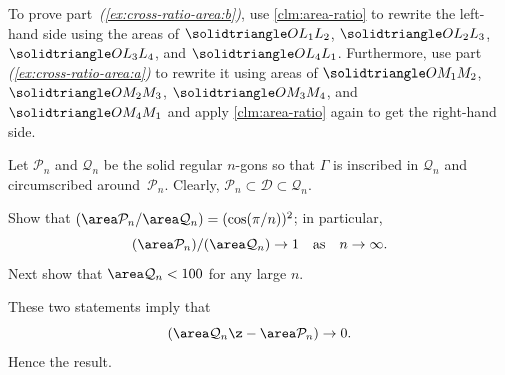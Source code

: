 To prove part~\textit{(\ref{ex:cross-ratio-area:b})}, use \ref{clm:area-ratio} to rewrite the left-hand side using the areas of $\solidtriangle OL_1L_2$, $\solidtriangle OL_2L_3$, $\solidtriangle OL_3L_4$, and $\solidtriangle OL_4L_1$.
Furthermore, use part \textit{(\ref{ex:cross-ratio-area:a})} to rewrite it using areas of $\solidtriangle OM_1M_2$, $\solidtriangle OM_2M_3$, $\solidtriangle OM_3M_4$, and $\solidtriangle OM_4M_1$ and apply \ref{clm:area-ratio} again to get the right-hand side.


Let $\mathcal{P}_n$ and $\mathcal{Q}_n$ be the solid regular $n$-gons
so that $\Gamma$ is inscribed in $\mathcal{Q}_n$ and circumscribed around~$\mathcal{P}_n$.
Clearly,
$\mathcal{P}_n\subset\mathcal{D}\subset\mathcal{Q}_n$.

Show that 
$\tfrac{\area\mathcal{P}_n}{\area\mathcal{Q}_n}=(\cos\tfrac\pi n)^2$;
in particular, 
$$\frac{\area\mathcal{P}_n}{\area\mathcal{Q}_n}\to 1
\quad
\text{as}
\quad
n\to\infty.$$
Next show that $\area\mathcal{Q}_n<100$ for any large $n$.

These two statements imply that
\[(\area\mathcal{Q}_n\z-\area\mathcal{P}_n)\to 0.\]
Hence the result.

\spell{\end{multicols}}{}

\newpage
